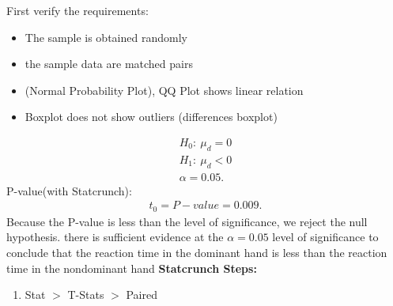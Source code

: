 \documentclass{report}
\begin{document}
\begin{mdframed}
      First verify the requirements:
      \begin{itemize}
          \item The sample is obtained randomly
            \item the sample data are matched pairs
            \item (Normal Probability Plot), QQ Plot shows linear relation 
            \item Boxplot does not show outliers (differences boxplot)
      \end{itemize}
      \begin{align*}
          H_{0}:\ \mu_{d} = 0\\
          H_{1}:\ \mu_{d} < 0 \\
          \alpha = 0.05
      .\end{align*}
      \bigbreak \noindent 
      P-value(with Statcrunch):
      \begin{align*}
          t_{0}  = P-value = 0.009
      .\end{align*}
      \bigbreak \noindent 
      Because the P-value is less than the level of significance, we reject the null hypothesis.
      \bigbreak \noindent 
      there is sufficient evidence at the $\alpha = 0.05 $ level of significance to conclude that the reaction time in the dominant hand is less than the reaction time in the nondominant hand
      \bigbreak \noindent 
      \textbf{Statcrunch Steps:}
      \begin{enumerate}
          \item Stat $> $ T-Stats $> $ Paired
      \end{enumerate}



    \end{mdframed}
\end{document}
